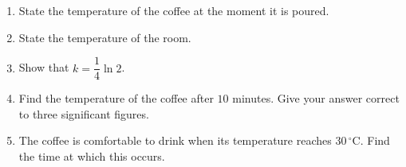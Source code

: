 \documentclass[12pt, twoside]{article}
\begin{document}
\begin{enumerate}[itemsep=0.15cm]
\begin{enumerate}[itemsep=0.15cm]
  \item State the temperature of the coffee at the moment it is
  poured.

  \item State the temperature of the room.

  \item Show that $k = \dfrac{1}{4}\ln 2$.

  \item Find the temperature of the coffee after $10$ minutes. Give
  your answer correct to three significant figures.

  \item The coffee is comfortable to drink when its temperature
  reaches $30\,^{\circ}$C. Find the time at which this occurs.
\end{enumerate}


\end{enumerate}
\end{document}
